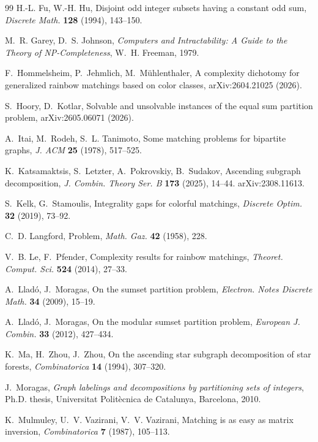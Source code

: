 \documentclass[11pt]{article}
\theoremstyle{definition}
\theoremstyle{remark}
\begin{document}
\begin{thebibliography}{99}
H.-L. Fu, W.-H. Hu,
Disjoint odd integer subsets having a constant odd sum,
\emph{Discrete Math.} \textbf{128} (1994), 143--150.

M.~R. Garey, D.~S. Johnson,
\emph{Computers and Intractability: A Guide to the Theory of NP-Completeness},
W.~H. Freeman, 1979.

F.~Hommelsheim, P.~Jehmlich, M.~Mühlenthaler,
A complexity dichotomy for generalized rainbow matchings based on color classes,
arXiv:2604.21025 (2026).

S.~Hoory, D.~Kotlar,
Solvable and unsolvable instances of the equal sum partition problem,
arXiv:2605.06071 (2026).

A.~Itai, M.~Rodeh, S.~L. Tanimoto,
Some matching problems for bipartite graphs,
\emph{J. ACM} \textbf{25} (1978), 517--525.

K.~Katsamaktsis, S.~Letzter, A.~Pokrovskiy, B.~Sudakov,
Ascending subgraph decomposition,
\emph{J. Combin. Theory Ser. B} \textbf{173} (2025), 14--44. arXiv:2308.11613.

S.~Kelk, G.~Stamoulis,
Integrality gaps for colorful matchings,
\emph{Discrete Optim.} \textbf{32} (2019), 73--92.

C.~D. Langford,
Problem,
\emph{Math. Gaz.} \textbf{42} (1958), 228.

V.~B. Le, F.~Pfender,
Complexity results for rainbow matchings,
\emph{Theoret. Comput. Sci.} \textbf{524} (2014), 27--33.

A.~Lladó, J.~Moragas,
On the sumset partition problem,
\emph{Electron. Notes Discrete Math.} \textbf{34} (2009), 15--19.

A.~Lladó, J.~Moragas,
On the modular sumset partition problem,
\emph{European J. Combin.} \textbf{33} (2012), 427--434.

K.~Ma, H.~Zhou, J.~Zhou,
On the ascending star subgraph decomposition of star forests,
\emph{Combinatorica} \textbf{14} (1994), 307--320.

J.~Moragas,
\emph{Graph labelings and decompositions by partitioning sets of integers},
Ph.D. thesis, Universitat Polit\`ecnica de Catalunya, Barcelona, 2010.

K.~Mulmuley, U.~V. Vazirani, V.~V. Vazirani,
Matching is as easy as matrix inversion,
\emph{Combinatorica} \textbf{7} (1987), 105--113.


\end{thebibliography}
\end{document}
